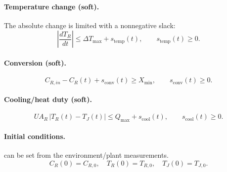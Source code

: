 \documentclass[11pt]{article}
\begin{document}
\paragraph{Temperature change (soft).} The absolute change is limited with a nonnegative slack:
\begin{equation}
    \left|\frac{dT_R}{dt}\right| \le \Delta T_{\max} + s_{\mathrm{temp}}(t), \qquad s_{\mathrm{temp}}(t) \ge 0.
\end{equation}

\paragraph{Conversion (soft).}
\begin{equation}
    {C_{R,in} - C_R(t)} + s_{\mathrm{conv}}(t) \ge X_{\min}, \qquad s_{\mathrm{conv}}(t) \ge 0.
\end{equation}

\paragraph{Cooling/heat duty (soft).}
\begin{equation}
    U A_R \,\big|T_R(t) - T_J(t)\big| \le Q_{\max} + s_{\mathrm{cool}}(t), \qquad s_{\mathrm{cool}}(t) \ge 0.
\end{equation}

\paragraph{Initial conditions.}
can be set from the environment/plant measurements.
\begin{equation}
    C_R(0) = C_{R,0}, \quad T_R(0) = T_{R,0}, \quad T_J(0) = T_{J,0}.
\end{equation}

\end{document}
